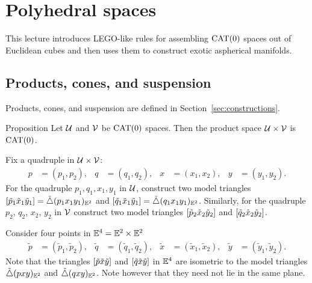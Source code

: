 \chapter{Polyhedral spaces}\label{chap:poly}

This lecture introduces LEGO-like rules for assembling $\mathrm{CAT}(0)$ spaces out of Euclidean cubes and then uses them to construct exotic aspherical manifolds.

\section{Products, cones, and suspension}
\label{sec:Products and cones}

Products, cones, and suspension are defined in Section~\ref{sec:constructions}.

\begin{thm}{Proposition}\label{ex:product-CAT}
Let $\mathcal{U}$ and $\mathcal{V}$ be $\mathrm{CAT}(0)$ spaces.
Then the product space $\mathcal{U}\times\mathcal{V}$ is $\mathrm{CAT}(0)$.
\end{thm}

Fix a quadruple in $\mathcal{U}\times \mathcal{V}$:
\begin{align*}
p&=(p_1,p_2),
&
q&=(q_1,q_2), 
&
x&=(x_1,x_2),
&
y&=(y_1,y_2).
\end{align*}
For the quadruple $p_1,q_1,x_1,y_1$ in $\mathcal{U}$,
construct two model triangles $\trig{\tilde p_1}{\tilde x_1}{\tilde y_1}\z=\modtrig(p_1x_1y_1)_{\EE^2}$
and $[\tilde q_1\tilde x_1\tilde y_1]=\tilde\triangle(q_1x_1y_1)_{\mathbb{E}^2}$.
Similarly, for the quadruple $p_2$, $q_2$, $x_2$, $y_2$ in $\mathcal{V}$
construct two model triangles $[\tilde p_2\tilde x_2\tilde y_2]$ and $[\tilde q_2\tilde x_2\tilde y_2]$.

Consider four points in $\mathbb{E}^4=\mathbb{E}^2\times\mathbb{E}^2$ 
\begin{align*}
\tilde p&=(\tilde p_1,\tilde p_2),
&
\tilde q&=(\tilde q_1,\tilde q_2),
&
\tilde x&=(\tilde x_1,\tilde x_2),
&
\tilde y&=(\tilde y_1,\tilde y_2).
\end{align*}
Note that the triangles $[\tilde p\tilde x\tilde y]$ and $[\tilde q\tilde x\tilde y]$ in $\mathbb{E}^4$ are isometric to the model triangles 
$\tilde\triangle(pxy)_{\mathbb{E}^2}$ and $\tilde\triangle(qxy)_{\mathbb{E}^2}$.
Note however that they need not lie in the same plane.

